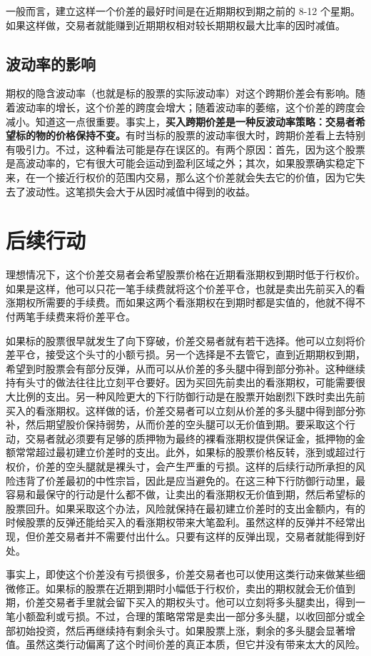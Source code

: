 一般而言，建立这样一个价差的最好时间是在近期期权到期之前的 8-12 个星期。如果这样做，交易者就能赚到近期期权相对较长期期权最大比率的因时减值。
\subsection{波动率的影响}
期权的隐含波动率（也就是标的股票的实际波动率）对这个跨期价差会有影响。随着波动率的增长，这个价差的跨度会增大；随着波动率的萎缩，这个价差的跨度会减小。知道这一点很重要。事实上，\textbf{买入跨期价差是一种反波动率策略：交易者希望标的物的价格保持不变。}有时当标的股票的波动率很大时，跨期价差看上去特别有吸引力。不过，这种看法可能是存在误区的。有两个原因：首先，因为这个股票是高波动率的，它有很大可能会运动到盈利区域之外；其次，如果股票确实稳定下来，在一个接近行权价的范围内交易，那么这个价差就会失去它的价值，因为它失去了波动性。这笔损失会大于从因时减值中得到的收益。
\section{后续行动}
理想情况下，这个价差交易者会希望股票价格在近期看涨期权到期时低于行权价。如果是这样，他可以只花一笔手续费就将这个价差平仓，也就是卖出先前买入的看涨期权所需要的手续费。而如果这两个看涨期权在到期时都是实值的，他就不得不付两笔手续费来将价差平仓。

如果标的股票很早就发生了向下穿破，价差交易者就有若干选择。他可以立刻将价差平仓，接受这个头寸的小额亏损。另一个选择是不去管它，直到近期期权到期，希望到时股票会有部分反弹，从而可以从价差的多头腿中得到部分弥补。这种继续持有头寸的做法往往比立刻平仓要好。因为买回先前卖出的看涨期权，可能需要很大比例的支出。另一种风险更大的下行防御行动是在股票开始剧烈下跌时卖出先前买入的看涨期权。这样做的话，价差交易者可以立刻从价差的多头腿中得到部分弥补，然后期望股价保持弱势，从而价差的空头腿可以无价值到期。要采取这个行动，交易者就必须要有足够的质押物为最终的裸看涨期权提供保证金，抵押物的金额常常超过最初建立价差时的支出。此外，如果标的股票价格反转，涨到或超过行权价，价差的空头腿就是裸头寸，会产生严重的亏损。这样的后续行动所承担的风险违背了价差最初的中性宗旨，因此是应当避免的。在这三种下行防御行动里，最容易和最保守的行动是什么都不做，让卖出的看涨期权无价值到期，然后希望标的股票回升。如果采取这个办法，风险就保持在最初建立价差时的支出金额内，有的时候股票的反弹还能给买入的看涨期权带来大笔盈利。虽然这样的反弹并不经常出现，但价差交易者并不需要付出什么。只要有这样的反弹出现，交易者就能得到好处。

事实上，即使这个价差没有亏损很多，价差交易者也可以使用这类行动来做某些细微修正。如果标的股票在近期到期时小幅低于行权价，卖出的期权就会无价值到期，价差交易者手里就会留下买入的期权头寸。他可以立刻将多头腿卖出，得到一笔小额盈利或亏损。不过，合理的策略常常是卖出一部分多头腿，以收回部分或全部初始投资，然后再继续持有剩余头寸。如果股票上涨，剩余的多头腿会显著增值。虽然这类行动偏离了这个时间价差的真正本质，但它并没有带来太大的风险。

